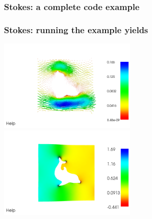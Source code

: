 \begin{frame}[fragile, shrink=40]
\frametitle{Stokes: a complete code example}
\end{frame}

\begin{frame}[fragile]
\frametitle{Stokes: running the example yields}
\includegraphics[width=0.5\textwidth]{png/velocity.png}
\includegraphics[width=0.5\textwidth]{png/pressure.png}
\end{frame}
